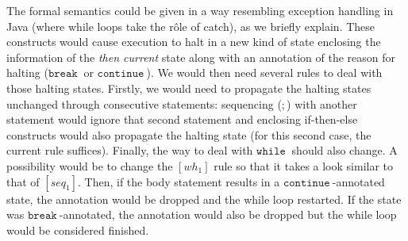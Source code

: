 \documentclass[a4wide,12pt]{article}
\def\while{\texttt{while}\ }
\def\cont {\texttt{continue}\ }
\def\break{\texttt{break}\ }
\begin{document}
The formal semantics could be given in a way resembling exception handling in Java (where while loops take
the r\^{o}le of catch), as we briefly explain. These constructs
would cause execution to halt in a new kind of state
enclosing the information of the \emph{then current} state along with an annotation of the reason
for halting ($\break$ or $\cont$).
We would then need several rules to deal with those halting states.
Firstly, we would need to propagate the halting states unchanged through consecutive statements:
sequencing ($;$) with another statement would ignore that second statement and enclosing
if-then-else constructs would also propagate the halting state (for this second case, the current
rule suffices). Finally, the way to deal with $\while$ should also change. A possibility
would be to change the $[wh_1]$ rule so that it takes a look similar to that of $[seq_1]$.
Then, if the body statement results in a $\cont$-annotated state, the annotation would be dropped
and the while loop restarted. If the state was $\break$-annotated, the annotation would also be
dropped but the while loop would be considered finished.
 
\end{document}
